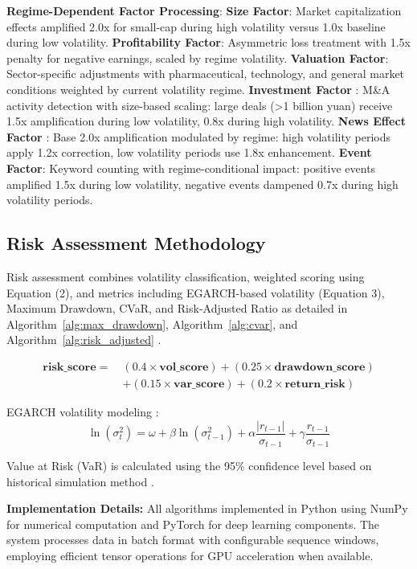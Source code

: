 \documentclass[3p,times,procedia]{elsarticle}
\begin{document}
\textbf{Regime-Dependent Factor Processing}: \textbf{Size Factor}: Market capitalization effects amplified 2.0x for small-cap during high volatility versus 1.0x baseline during low volatility. \textbf{Profitability Factor}: Asymmetric loss treatment with 1.5x penalty for negative earnings, scaled by regime volatility. \textbf{Valuation Factor}: Sector-specific adjustments with pharmaceutical, technology, and general market conditions weighted by current volatility regime. \textbf{Investment Factor} \cite{Daniel1998}: M\&A activity detection with size-based scaling: large deals (>1 billion yuan) receive 1.5x amplification during low volatility, 0.8x during high volatility. \textbf{News Effect Factor} \cite{TETLOCK2007}: Base 2.0x amplification modulated by regime: high volatility periods apply 1.2x correction, low volatility periods use 1.8x enhancement. \textbf{Event Factor}: Keyword counting with regime-conditional impact: positive events amplified 1.5x during low volatility, negative events dampened 0.7x during high volatility periods.

\subsection{Risk Assessment Methodology}
Risk assessment combines volatility classification, weighted scoring using Equation (2), and metrics including EGARCH-based volatility (Equation 3), Maximum Drawdown, CVaR, and Risk-Adjusted Ratio as detailed in Algorithm~\ref{alg:max_drawdown}, Algorithm~\ref{alg:cvar}, and Algorithm~\ref{alg:risk_adjusted} \cite{Jorion2001}.

\begin{align}
\mathbf{risk\_score} =\ & (0.4 \times \mathbf{vol\_score}) + (0.25 \times \mathbf{drawdown\_score}) \nonumber \\
& + (0.15 \times \mathbf{var\_score}) + (0.2 \times \mathbf{return\_risk})
\end{align}

EGARCH volatility modeling \cite{Nelson1991}:
\begin{equation}
\ln(\sigma_t^2) = \omega + \beta \ln(\sigma_{t-1}^2) + \alpha \frac{|r_{t-1}|}{\sigma_{t-1}} + \gamma \frac{r_{t-1}}{\sigma_{t-1}}
\end{equation}

Value at Risk (VaR) is calculated using the 95\% confidence level based on historical simulation method \cite{Jorion2001}.

\textbf{Implementation Details:} All algorithms implemented in Python using NumPy for numerical computation and PyTorch for deep learning components. The system processes data in batch format with configurable sequence windows, employing efficient tensor operations for GPU acceleration when available.
\end{document}

